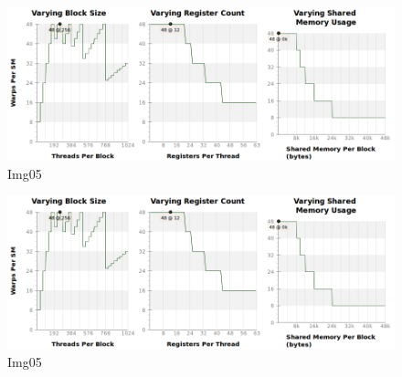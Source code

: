 \documentclass[a4paper]{article}
\begin{document}
\begin{figure}[ht]
    \centering
    \includegraphics[width=0.7\linewidth]{profiling/darker/darker_varying}
    \caption{Img05}
    \label{fig:histo}
\end{figure}
\FloatBarrier



\begin{figure}[ht]
    \centering
    \includegraphics[width=0.7\linewidth]{profiling/darker/darker_varying}
    \caption{Img05}
    \label{fig:histo}
\end{figure}
\FloatBarrier

\printbibliography 
\end{document}
